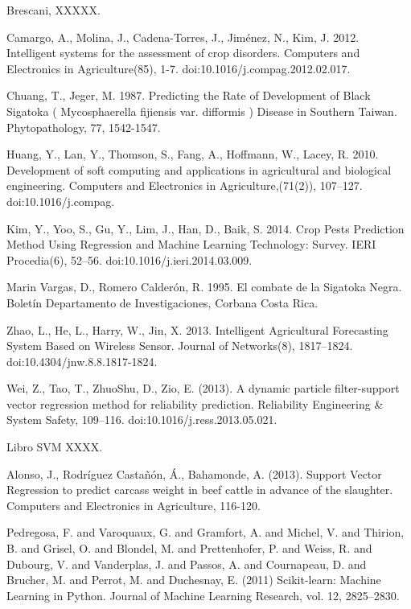 \documentclass[review]{elsarticle}
\begin{document}
\begin{thebibliography}{1}

 Brescani, XXXXX.

 Camargo, A., Molina, J., Cadena-Torres, J., Jim\'enez, N., Kim, J. 2012. Intelligent systems for the assessment of crop disorders. Computers and Electronics in Agriculture(85), 1-7. doi:10.1016/j.compag.2012.02.017.

 Chuang, T., Jeger, M. 1987. Predicting the Rate of Development of Black Sigatoka ( Mycosphaerella fijiensis var. difformis ) Disease in Southern Taiwan. Phytopathology, 77, 1542-1547.

 Huang, Y., Lan, Y., Thomson, S., Fang, A., Hoffmann, W., Lacey, R. 2010. Development of soft computing and applications in agricultural and biological engineering. Computers and Electronics in Agriculture,(71(2)), 107–127. doi:10.1016/j.compag.

 Kim, Y., Yoo, S., Gu, Y., Lim, J., Han, D.,  Baik, S. 2014. Crop Pests Prediction Method Using Regression and Machine Learning Technology: Survey. IERI Procedia(6), 52–56. doi:10.1016/j.ieri.2014.03.009.

 Marin Vargas, D., Romero Calderón, R. 1995. El combate de la Sigatoka Negra. Bolet\'in Departamento de Investigaciones, Corbana Costa Rica.

Zhao, L., He, L., Harry, W., Jin, X. 2013. Intelligent Agricultural Forecasting System Based on Wireless Sensor. Journal of Networks(8), 1817–1824. doi:10.4304/jnw.8.8.1817-1824.

 Wei, Z., Tao, T., ZhuoShu, D.,  Zio, E. (2013). A dynamic particle filter-support vector regression method for reliability prediction. Reliability Engineering \& System Safety, 109–116. doi:10.1016/j.ress.2013.05.021.

 Libro SVM XXXX.

 Alonso, J., Rodríguez Castañón, Á., Bahamonde, A. (2013). Support Vector Regression to predict carcass weight in beef cattle in advance of the slaughter. Computers and Electronics in Agriculture, 116-120.

 Pedregosa, F. and Varoquaux, G. and Gramfort, A. and Michel, V. and Thirion, B. and Grisel, O. and Blondel, M. and Prettenhofer, P. and Weiss, R. and Dubourg, V. and Vanderplas, J. and Passos, A. and Cournapeau, D. and Brucher, M. and Perrot, M. and Duchesnay, E. (2011) Scikit-learn: Machine Learning in {P}ython. Journal of Machine Learning Research, vol. 12, 2825--2830.


\end{thebibliography}
\end{document}
